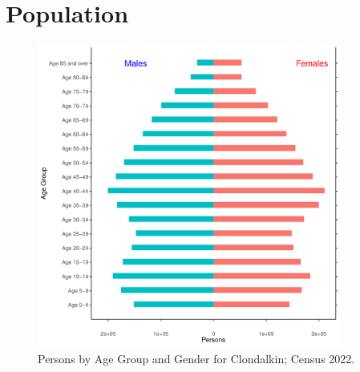 \documentclass{article}
\begin{document}
\pagebreak

\section{Population} 
\label{sect:Pop}

\begin{figure}[h]
	\centering
	\includegraphics[width = 100mm]{../figures/PyramidPlot.pdf}
	\caption{Persons by Age Group and Gender for Clondalkin; Census 2022.}
	\label{fig:2ae19629-1a6a-13a3-e055-000000000001}
	\end{figure}
\end{document}
